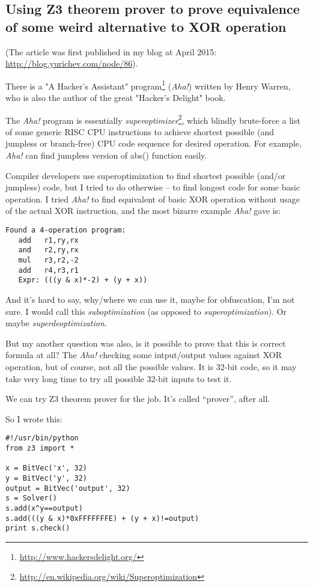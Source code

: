 \subsection{Using Z3 theorem prover to prove equivalence of some weird alternative to XOR operation}
\label{weird_XOR}

(The article was first published in my blog at April 2015: \url{http://blog.yurichev.com/node/86}).

There is a "A Hacker's Assistant" program\footnote{\url{http://www.hackersdelight.org/}} (\textit{Aha!}) written by Henry Warren,
who is also the author of the great "Hacker's Delight" book.

The \textit{Aha!} program is essentially \textit{superoptimizer}\footnote{\url{http://en.wikipedia.org/wiki/Superoptimization}},
which blindly brute-force a list of some generic RISC CPU instructions to achieve shortest possible (and jumpless or branch-free) 
CPU code sequence for desired operation.
For example, \textit{Aha!} can find jumpless version of abs() function easily.

Compiler developers use superoptimization to find shortest possible (and/or jumpless) code, but I tried to do otherwise -- to find longest code for some basic operation.
I tried \textit{Aha!} to find equivalent of basic XOR operation without usage of the actual XOR instruction, and the most bizarre example \textit{Aha!} gave is:

\begin{lstlisting}
Found a 4-operation program:
   add   r1,ry,rx
   and   r2,ry,rx
   mul   r3,r2,-2
   add   r4,r3,r1
   Expr: (((y & x)*-2) + (y + x))
\end{lstlisting}

And it's hard to say, why/where we can use it, maybe for obfuscation, I'm not sure.
I would call this \textit{suboptimization} (as opposed to \textit{superoptimization}). Or maybe \textit{superdeoptimization}.

But my another question was also, is it possible to prove that this is correct formula at all?
The \textit{Aha!} checking some intput/output values against XOR operation, but of course, not all the possible values.
It is 32-bit code, so it may take very long time to try all possible 32-bit inputs to test it.

We can try Z3 theorem prover for the job. It's called ``prover'', after all.

So I wrote this:

\begin{lstlisting}
#!/usr/bin/python
from z3 import *

x = BitVec('x', 32)
y = BitVec('y', 32)
output = BitVec('output', 32)
s = Solver()
s.add(x^y==output)
s.add(((y & x)*0xFFFFFFFE) + (y + x)!=output)
print s.check()
\end{lstlisting}

